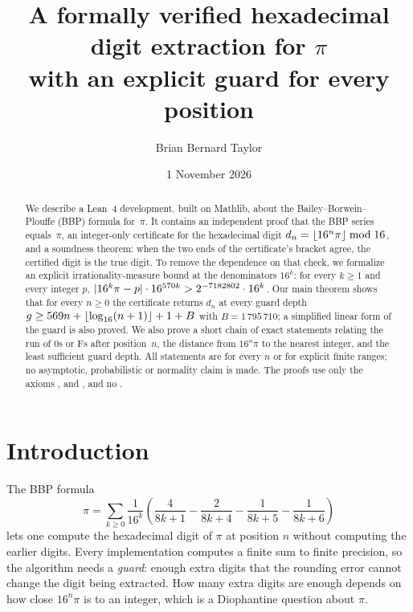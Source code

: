 \documentclass[11pt]{amsart}
\theoremstyle{definition}
\theoremstyle{remark}
\DeclarePairedDelimiter{\floor}{\lfloor}{\rfloor}
\DeclarePairedDelimiter{\abs}{\lvert}{\rvert}
\newcommand{\Bconst}{1\,795\,710}
\begin{document}
\title[Verified hexadecimal digits of $\pi$ for every position]
  {A formally verified hexadecimal digit extraction for $\pi$\\
   with an explicit guard for every position}

\author{Brian Bernard Taylor}


\date{1 November 2026}

\begin{abstract}
We describe a Lean~4 development, built on Mathlib, about the
Bailey--Borwein--Plouffe (BBP) formula for~$\pi$. It contains an independent
proof that the BBP series equals~$\pi$, an integer-only certificate for the
hexadecimal digit $d_n=\floor{16^n\pi}\bmod 16$, and a soundness theorem: when
the two ends of the certificate's bracket agree, the certified digit is the
true digit. To remove the dependence on that check, we formalize an explicit
irrationality-measure bound at the denominators $16^k$: for every $k\ge1$ and
every integer $p$,
$\abs{16^k\pi-p}\cdot16^{570k}>2^{-7182802}\cdot16^k$.
Our main theorem shows that for every $n\ge0$ the certificate returns $d_n$
at every guard depth $g\ge 569n+\floor{\log_{16}(n+1)}+1+B$ with
$B=\Bconst$; a simplified linear form of the guard is also proved. We
also prove a short chain of exact statements relating the run of $0$s or
$\mathrm{F}$s after position~$n$, the distance from $16^n\pi$ to the nearest
integer, and the least sufficient guard depth. All statements are for every
$n$ or for explicit finite ranges; no asymptotic, probabilistic or normality
claim is made. The proofs use only the axioms ,
 and , and no .
\end{abstract}

\maketitle

\section{Introduction}\label{sec:intro}

The BBP formula~\cite{BBP1997}
\begin{equation}\label{eq:bbp}
  \pi=\sum_{k\ge0}\frac{1}{16^k}\left(\frac{4}{8k+1}-\frac{2}{8k+4}-\frac{1}{8k+5}-\frac{1}{8k+6}\right)
\end{equation}
lets one compute the hexadecimal digit of $\pi$ at position $n$ without
computing the earlier digits. Every implementation computes a finite sum to
finite precision, so the algorithm needs a \emph{guard}: enough extra digits
that the rounding error cannot change the digit being extracted. How many extra
digits are enough depends on how close $16^n\pi$ is to an integer, which is a
Diophantine question about $\pi$.
\end{document}
